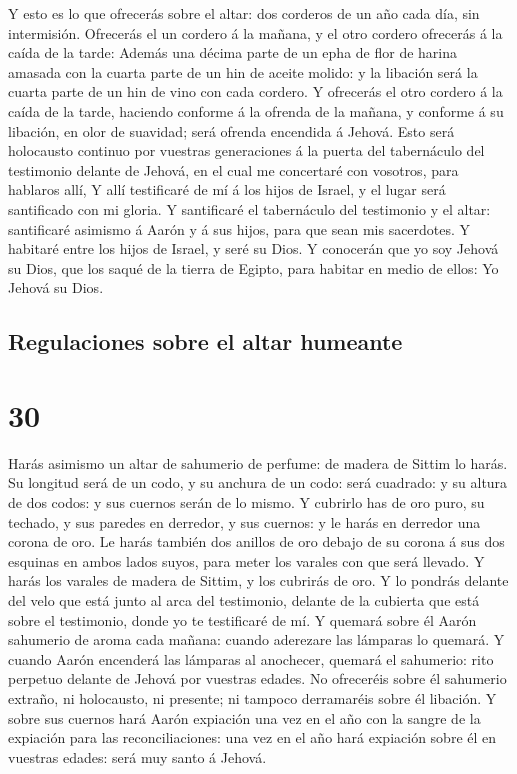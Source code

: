  Y esto es lo que ofrecerás sobre el altar: dos corderos
de un año cada día, sin intermisión.  Ofrecerás el un
cordero á la mañana, y el otro cordero ofrecerás á la caída de la tarde:
 Además una décima parte de un epha de flor de harina
amasada con la cuarta parte de un hin de aceite molido: y la libación
será la cuarta parte de un hin de vino con cada cordero. 
Y ofrecerás el otro cordero á la caída de la tarde, haciendo conforme á
la ofrenda de la mañana, y conforme á su libación, en olor de suavidad;
será ofrenda encendida á Jehová.  Esto será holocausto
continuo por vuestras generaciones á la puerta del tabernáculo del
testimonio delante de Jehová, en el cual me concertaré con vosotros,
para hablaros allí,  Y allí testificaré de mí á los hijos
de Israel, y el lugar será santificado con mi gloria.  Y
santificaré el tabernáculo del testimonio y el altar: santificaré
asimismo á Aarón y á sus hijos, para que sean mis sacerdotes.
 Y habitaré entre los hijos de Israel, y seré su Dios.
 Y conocerán que yo soy Jehová su Dios, que los saqué de
la tierra de Egipto, para habitar en medio de ellos: Yo Jehová su Dios.

\hypertarget{regulaciones-sobre-el-altar-humeante}{%
\subsection{Regulaciones sobre el altar
humeante}\label{regulaciones-sobre-el-altar-humeante}}

\hypertarget{section-02-30}{%
\section{30}\label{section-02-30}}

 Harás asimismo un altar de sahumerio de perfume: de
madera de Sittim lo harás.  Su longitud será de un codo, y
su anchura de un codo: será cuadrado: y su altura de dos codos: y sus
cuernos serán de lo mismo.  Y cubrirlo has de oro puro, su
techado, y sus paredes en derredor, y sus cuernos: y le harás en
derredor una corona de oro.  Le harás también dos anillos
de oro debajo de su corona á sus dos esquinas en ambos lados suyos, para
meter los varales con que será llevado.  Y harás los
varales de madera de Sittim, y los cubrirás de oro.  Y lo
pondrás delante del velo que está junto al arca del testimonio, delante
de la cubierta que está sobre el testimonio, donde yo te testificaré de
mí.  Y quemará sobre él Aarón sahumerio de aroma cada
mañana: cuando aderezare las lámparas lo quemará.  Y
cuando Aarón encenderá las lámparas al anochecer, quemará el sahumerio:
rito perpetuo delante de Jehová por vuestras edades.  No
ofreceréis sobre él sahumerio extraño, ni holocausto, ni presente; ni
tampoco derramaréis sobre él libación.  Y sobre sus
cuernos hará Aarón expiación una vez en el año con la sangre de la
expiación para las reconciliaciones: una vez en el año hará expiación
sobre él en vuestras edades: será muy santo á Jehová.


